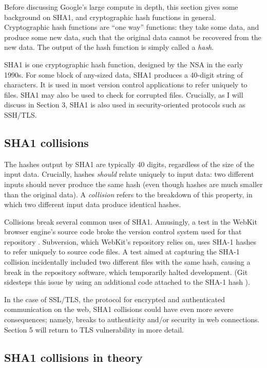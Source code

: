 \documentclass[sigconf]{acmart}
\begin{document}
Before discussing Google's large compute in depth,
this section gives some background on SHA1, and cryptographic hash functions in general.
Cryptographic hash functions are ``one way'' functions: 
they take some data, and produce some new data, such that the original data cannot be recovered from the new data. The output of the hash function is simply called a \emph{hash}.

SHA1 is one cryptographic hash function, designed by the NSA in the early 1990s.
For some block of any-sized data, SHA1 produces a 40-digit string of characters.
It is used in most version control applications to refer uniquely to files. SHA1 may also be used to check for corrupted files. 
Crucially, as I will discuss in Section 3, SHA1 is also used in security-oriented protocols such as SSH/TLS.


\subsection{SHA1 collisions}
\label{sec:org7d11859}

The hashes output by SHA1 are typically 40 digits, regardless of the size of the input data.
Crucially, hashes \emph{should} relate uniquely to input data: 
two different inputs should never produce the same hash (even though hashes are much smaller than the original data).
A \emph{collision} refers to the breakdown of this property,
in which two different input data produce identical hashes.

Collisions break several common uses of SHA1. 
Amusingly, a test in the WebKit browser engine's source code
broke the version control system used for that repository \cite{Koivisto2017}.
Subversion, which WebKit's repository relies on, uses SHA-1 hashes to refer uniquely to source code files.
A test aimed at capturing the SHA-1 collision incidentally included two different files with the same hash, 
causing a break in the repository software, which temporarily halted development.
(Git sidesteps this issue by using an additional code  attached to the SHA-1 hash \cite{Torvalds2017}).

In the case of SSL/TLS, the protocol for encrypted and authenticated communication on the web, SHA1 collisions could have even more severe consequences;
namely, breaks to authenticity and/or security in web connections.
Section 5 will return to TLS vulnerability in more detail.

\subsection{SHA1 collisions in theory}
\label{sec:orga808bf1}
\end{document}

